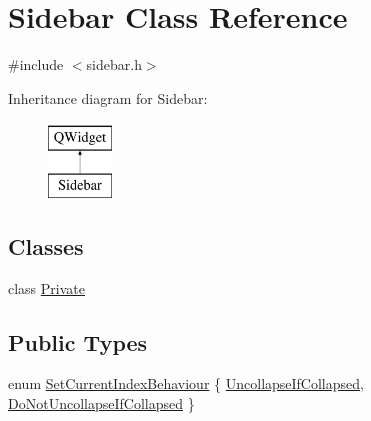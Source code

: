 \hypertarget{classSidebar}{\section{Sidebar Class Reference}
\label{classSidebar}
}


{\ttfamily \#include $<$sidebar.\+h$>$}

Inheritance diagram for Sidebar\+:\begin{figure}[H]
\begin{center}
\leavevmode
\includegraphics[height=2.000000cm]{classSidebar}
\end{center}
\end{figure}
\subsection*{Classes}
\begin{DoxyCompactItemize}
\item 
class \hyperlink{classSidebar_1_1Private}{Private}
\end{DoxyCompactItemize}
\subsection*{Public Types}
\begin{DoxyCompactItemize}
\item 
enum \hyperlink{classSidebar_af06ad6ae553bd93cabeef79df1277342}{Set\+Current\+Index\+Behaviour} \{ \hyperlink{classSidebar_af06ad6ae553bd93cabeef79df1277342acd60138922798b43dcd1004c95f00fb4}{Uncollapse\+If\+Collapsed}, 
\hyperlink{classSidebar_af06ad6ae553bd93cabeef79df1277342a8595bb09015022393bc23cca88e491f5}{Do\+Not\+Uncollapse\+If\+Collapsed}
 \}
\end{DoxyCompactItemize}
